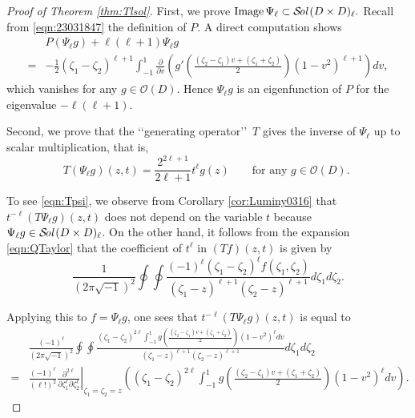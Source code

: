 \documentclass[10pt,a4paper]{amsart}
\newcommand\Sol{{\mathcal {S}}\!{\text{\it{ol}}}\,}
\begin{document}
\begin{proof}
[Proof of Theorem \ref{thm:Tlsol}]
First, 
 we prove
$
  \operatorname{Image}\Psi_{\ell} \subset \Sol(D \times D)_{\ell}.  
$
Recall from \eqref{eqn:23031847} the definition of $P.$  
A direct computation shows 
\begin{align*}
&P(\Psi_{\ell}g)
+ \ell (\ell+1) \Psi_{\ell}g 
\\
=&
 -\frac 1 2 (\zeta_1 - \zeta_2)^{\ell+1} \int_{-1}^1 \frac{\partial}{\partial v}
 (g'(\frac{(\zeta_2- \zeta_1)v+(\zeta_1 + \zeta_2)}2)(1-v^2)^{\ell+1}) d v, 
\end{align*}
which vanishes for any $g \in {\mathcal{O}}(D)$.  
Hence $\Psi_{\ell}g$ is an eigenfunction of $P$
 for the eigenvalue $-\ell(\ell+1)$.  



Second, 
 we prove
 that the \lq\lq{generating operator}\rq\rq\ $T$ gives
 the inverse of $\Psi_{\ell}$
 up to scalar multiplication, 
 that is, 
\begin{equation}
\label{eqn:Tpsi}
   T(\Psi_{\ell}g)(z,t)=\frac{2^{2 \ell+1}}{2 \ell +1} t^{\ell}g(z)
\qquad\text{for any $g \in {\mathcal{O}}(D)$.  }
\end{equation}



To see \eqref{eqn:Tpsi}, 
 we observe from Corollary \ref{cor:Luminy0316}
 that $t^{-\ell}(T \Psi_{\ell}g)(z,t)$ does not depend 
 on the variable $t$
 because $\Psi_{\ell} g \in \Sol(D \times D)_{\ell}$.  
On the other hand, 
 it follows from the expansion \eqref{eqn:QTaylor}
 that the coefficient of $t^{\ell}$ in $(T f)(z,t)$
 is given by 
\[
  \frac{1}{(2 \pi \sqrt{-1})^2}
  \oint \oint \frac{(-1)^{\ell}(\zeta_1-\zeta_2)^{\ell} f(\zeta_1, \zeta_2)}{
(\zeta_1-z)^{\ell+1}(\zeta_2-z)^{\ell+1}} d \zeta_1 d \zeta_2.  
\]



Applying this to $f=\Psi_{\ell}g$, 
 one sees that $t^{-\ell}(T \Psi_{\ell} g)(z,t)$ is equal to 
\begin{align*}
  &\frac{(-1)^{\ell}}{(2 \pi \sqrt{-1})^2}
  \oint \oint 
  \frac
  {(\zeta_1-\zeta_2)^{2\ell}\int_{-1}^1 g(\frac{(\zeta_2- \zeta_1)v+(\zeta_1 + \zeta_2)}2)(1-v^2)^{\ell} d v}
  {(\zeta_1-z)^{\ell+1}(\zeta_2-z)^{\ell+1}} d \zeta_1 d \zeta_2
\\
=& \frac{(-1)^{\ell}}{(\ell !)^2}
   \left. \frac{\partial^{2\ell}}
               {\partial \zeta_1^{\ell} \partial \zeta_2^{\ell}}\right|_{\zeta_1=\zeta_2=z}
   ((\zeta_1-\zeta_2)^{2\ell}
    \int_{-1}^1 g(\frac{(\zeta_2- \zeta_1)v+(\zeta_1 + \zeta_2)}2)(1-v^2)^{\ell} d v).  
\end{align*}




\end{proof}
\end{document}
